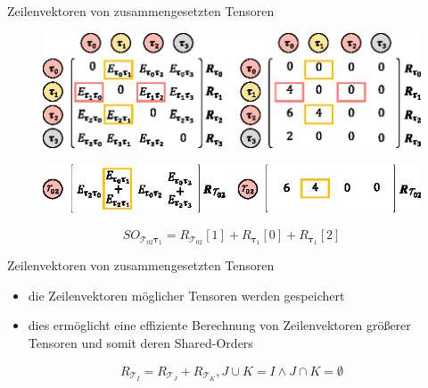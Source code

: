 \documentclass{beamer}
\newcommand{\Tau}{\bm{\mathcal{T}}}
\newcommand{\tauB}{\bm{\tau}}
\begin{document}
\begin{frame}{Zeilenvektoren von zusammengesetzten Tensoren}
	\begin{figure}
		\includegraphics[scale=.9]{figure_05_a_c}
	\end{figure} \pause
	\begin{figure}
		\includegraphics[scale=1.1]{figure_05_b_d}
	\end{figure} \pause
	\begin{equation*}
		SO_{\Tau_{02} \tauB_1} = R_{\Tau_{02}}[1] + R_{\tauB_1}[0] + R_{\tauB_1}[2]
	\end{equation*}
\end{frame}

\begin{frame}{Zeilenvektoren von zusammengesetzten Tensoren}
	\begin{itemize}
		\item die Zeilenvektoren möglicher Tensoren werden gespeichert
		\item dies ermöglicht eine effiziente Berechnung von Zeilenvektoren größerer Tensoren und somit deren Shared-Orders
	\end{itemize}
	\begin{equation*}
		R_{\Tau_I} = R_{\Tau_J} + R_{\Tau_K}, J \cup K = I \wedge J \cap K = \emptyset
	\end{equation*}
\end{frame}
\end{document}
